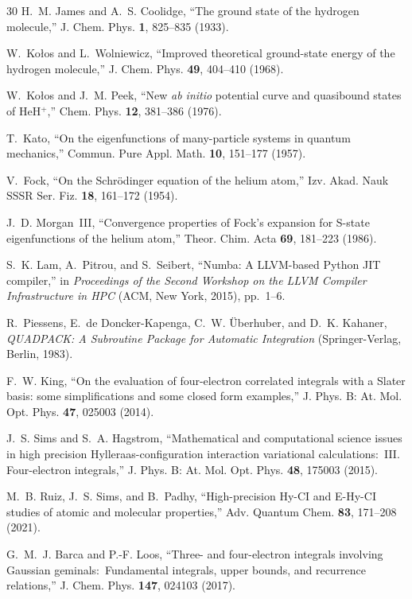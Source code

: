 \documentclass[aps,pra,twocolumn,superscriptaddress,longbibliography]{revtex4-2}
\begin{document}
\begin{thebibliography}{30}
H.~M. James and A.~S. Coolidge,
``The ground state of the hydrogen molecule,''
J. Chem. Phys. \textbf{1}, 825--835 (1933).

W.~Ko\l{}os and L.~Wolniewicz,
``Improved theoretical ground-state energy of the hydrogen
molecule,''
J. Chem. Phys. \textbf{49}, 404--410 (1968).

W.~Ko\l{}os and J.~M. Peek,
``New \textit{ab initio} potential curve and quasibound states of HeH$^+$,''
Chem. Phys. \textbf{12}, 381--386 (1976).

T.~Kato,
``On the eigenfunctions of many-particle systems in quantum
mechanics,''
Commun. Pure Appl. Math. \textbf{10}, 151--177 (1957).

V.~Fock,
``On the Schr\"odinger equation of the helium atom,''
Izv. Akad. Nauk SSSR Ser. Fiz. \textbf{18}, 161--172 (1954).

J.~D. Morgan~III,
``Convergence properties of Fock's expansion for S-state
eigenfunctions of the helium atom,''
Theor. Chim. Acta \textbf{69}, 181--223 (1986).

S.~K. Lam, A.~Pitrou, and S.~Seibert,
``Numba: A LLVM-based Python JIT compiler,''
in \textit{Proceedings of the Second Workshop on the LLVM
Compiler Infrastructure in HPC} (ACM, New York, 2015),
pp.\ 1--6.

R.~Piessens, E.~de Doncker-Kapenga, C.~W. \"Uberhuber,
and D.~K. Kahaner,
\textit{QUADPACK: A Subroutine Package for Automatic Integration}
(Springer-Verlag, Berlin, 1983).

F.~W. King,
``On the evaluation of four-electron correlated integrals with a Slater
basis: some simplifications and some closed form examples,''
J. Phys. B: At. Mol. Opt. Phys. \textbf{47}, 025003 (2014).

J.~S. Sims and S.~A. Hagstrom,
``Mathematical and computational science issues in high precision
Hylleraas-configuration interaction variational calculations:\ III.
Four-electron integrals,''
J. Phys. B: At. Mol. Opt. Phys. \textbf{48}, 175003 (2015).

M.~B. Ruiz, J.~S. Sims, and B.~Padhy,
``High-precision Hy-CI and E-Hy-CI studies of atomic and molecular
properties,''
Adv. Quantum Chem. \textbf{83}, 171--208 (2021).

G.~M.~J. Barca and P.-F. Loos,
``Three- and four-electron integrals involving Gaussian geminals:\
Fundamental integrals, upper bounds, and recurrence relations,''
J. Chem. Phys. \textbf{147}, 024103 (2017).


\end{thebibliography}
\end{document}
